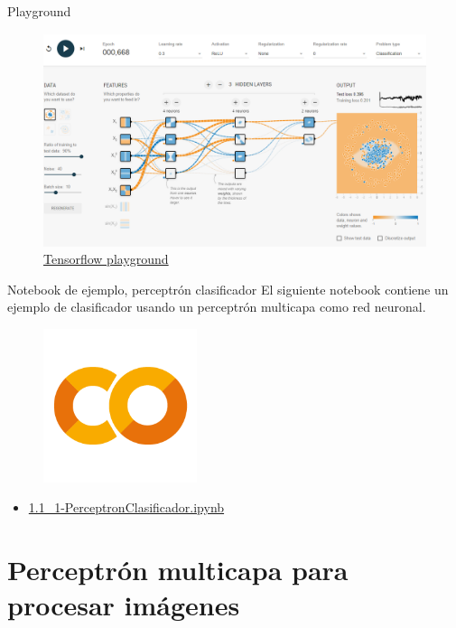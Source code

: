 \begin{frame}{Playground}
\begin{figure}
    \centering
    \includegraphics[width=\textwidth]{figures/Tema 3/Playground.png}
    \caption{\href{https://playground.tensorflow.org/}{Tensorflow playground}}
\end{figure}
\end{frame}

\begin{frame}{Notebook de ejemplo, perceptrón clasificador}
El siguiente notebook contiene un ejemplo de clasificador usando un perceptrón multicapa como red neuronal.

\begin{figure}
    \centering
    \includegraphics[width=0.4\textwidth]{figures/GoogleColab.png}
\end{figure}
\begin{itemize}
    \centering
    \item {\Large \href{https://colab.research.google.com/drive/1qzLr3sWe4Nk7LW9Jycb9vq-Offsg1yHL?usp=sharing}{1.1\_1-PerceptronClasificador.ipynb}}
\end{itemize}
\end{frame}

\section{Perceptrón multicapa para procesar imágenes}

